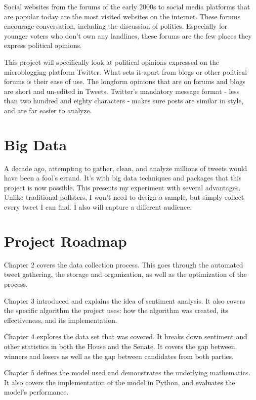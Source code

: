 \documentclass[11pt, twoside, reqno]{book}
\begin{document}
Social websites from the forums of the early 2000s to social media platforms that are popular today are the most visited websites on the internet. These forums encourage conversation, including the discussion of politics. Especially for younger voters who don’t own any landlines, these forums are the few places they express political opinions. 

This project will specifically look at political opinions expressed on the microblogging platform Twitter. What sets it apart from blogs or other political forums is their ease of use. The longform opinions that are on forums and blogs are short and un-edited in Tweets. Twitter’s mandatory message format - less than two hundred and eighty characters - makes sure posts are similar in style, and are far easier to analyze. 

\section{Big Data}
\hspace{0.2in}A decade ago, attempting to gather, clean, and analyze millions of tweets would have been a fool's errand. It's with big data techniques and packages that this project is now possible. This presents my experiment with several advantages. Unlike traditional pollsters, I won't need to design a sample, but simply collect every tweet I can find. I also will capture a different audience. 

\section{Project Roadmap}
\hspace{0.2in}Chapter 2 covers the data collection process. This goes through the automated tweet gathering, the storage and organization, as well as the optimization of the process. 

Chapter 3 introduced and explains the idea of sentiment analysis. It also covers the specific algorithm the project uses: how the algorithm was created, its effectiveness, and its implementation.

Chapter 4 explores the data set that was covered. It breaks down sentiment and other statistics in both the House and the Senate. It covers the gap between winners and losers as well as the gap between candidates from both parties. 

Chapter 5 defines the model used and demonstrates the underlying mathematics. It also covers the implementation of the model in Python, and evaluates the model's performance. 
\end{document}
